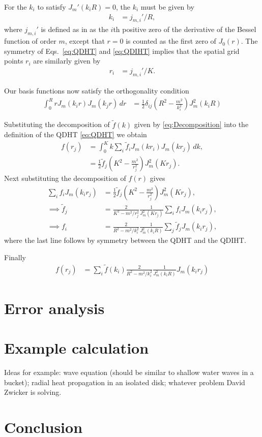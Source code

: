 \documentclass[aip,amsmath,amssymb,reprint,twocolumn]{revtex4-1}
\begin{document}
For the $k_i$ to satisfy $J_m'(k_i R) = 0$, the $k_i$ must be given by
\begin{align}
  k_i &= j_{m,i}'/R,
\end{align}
where $j_{m,i}'$ is defined as in \citet{Abramowitz:1972} as the $i$th positive zero of the derivative of the Bessel function of order $m$, except that $r=0$ is counted as the first zero of $J_0(r)$.  The symmetry of Eqs.~\eqref{eq:QDHT} and \eqref{eq:QDIHT} implies that the spatial grid points $r_i$ are similarly given by
\begin{align}
  r_i &= j_{m,i}'/K.
\end{align}

Our basis functions now satisfy the orthogonality condition
\begin{align}
  \int_0^R r J_m(k_i r) J_m(k_j r)\, dr &= \frac{1}{2} \delta_{ij} \left(R^2 - \frac{m^2}{k_i^2}\right) J_m^2(k_i R)
\end{align}

Substituting the decomposition of $\tilde{f}(k)$ given by \eqref{eq:Decomposition} into the definition of the QDHT \eqref{eq:QDHT} we obtain
\begin{align}
  f(r_j) &= \int_0^K k \sum_i \tilde{f}_i J_m(k r_i) J_m(k r_j)\, dk, \\
  &= \frac{1}{2}\tilde{f}_j \left(K^2 - \frac{m^2}{r_j^2}\right) J_m^2(K r_j).
\end{align}
Next substituting the decomposition of $f(r)$ gives
\begin{align}
  \sum_i f_i J_m(k_i r_j) &= \frac{1}{2}\tilde{f}_j \left(K^2 - \frac{m^2}{r_j^2}\right) J_m^2(K r_j), \\
  \implies \tilde{f}_j &= \frac{2}{K^2 - m^2/r_j^2} \frac{1}{J_m^2(K r_j)} \sum_i f_i J_m(k_i r_j), \\
  \implies f_i &= \frac{2}{R^2 - m^2/k_i^2} \frac{1}{J_m^2(k_i R)} \sum_j \tilde{f}_j J_m(k_i r_j),
\end{align}
where the last line follows by symmetry between the QDHT and the QDIHT.

Finally
\begin{align}
  f(r_j) &= \sum_i \tilde{f}(k_i) \frac{2}{R^2 - m^2/k_i^2}\frac{1}{J_m^2(k_i R)} J_m(k_i r_j)
\end{align}


\section{Error analysis}
\label{sec:ErrorAnalysis}

\section{Example calculation}
\label{sec:Example}
Ideas for example: wave equation (should be similar to shallow water waves in a bucket); radial heat propagation in an isolated disk; whatever problem David Zwicker is solving.

\section{Conclusion}
\label{sec:Conclusion}




\end{document}
